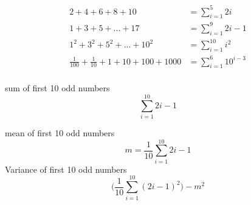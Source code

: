 $$\begin{aligned} 2 + 4 + 6 +8 + 10 &= \sum_{i=1}^{5}2i\\
 1 + 3 + 5 + ... + 17  &= \sum_{i=1}^{9}2i-1\\
 1^2 + 3^2 + 5^2 + ... + 10^2  &= \sum_{i=1}^{10}i^2\\
 \frac{1}{100} + \frac{1}{10} + 1 + 10 + 100 + 1000  &= \sum_{i=1}^{6}10^{i-3}\\
\end{aligned}$$


sum of first 10 odd numbers $$\sum_{i=1}^{10}2i-1$$

mean of first 10 odd numbers $$ m = \frac{1}{10}\sum_{i=1}^{10}2i-1$$
Variance of first 10 odd numbers $$\Big(\frac{1}{10}\sum_{i=1}^{10}(2i-1)^2\Big) - m^2$$
